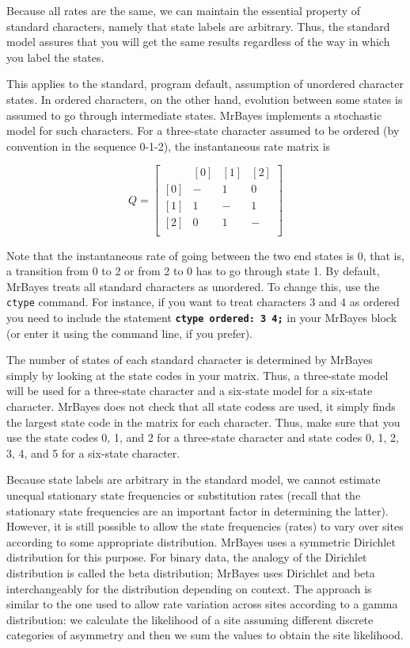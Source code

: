 \documentclass[12pt]{book}
\newcommand{\ttt}[1]{\texttt{#1}}
\newcommand{\tb}[1]{\ttt{\textbf{#1}}}
\begin{document}
Because all rates are the same, we can maintain the essential property of standard characters,
namely that state labels are arbitrary. Thus, the standard model assures that you will get the same
results regardless of the way in which you label the states.

This applies to the standard, program default, assumption of unordered character states. In ordered
characters, on the other hand, evolution between some states is assumed to go through intermediate
states. MrBayes implements a stochastic model for such characters. For a three-state character
assumed to be ordered (by convention in the sequence 0-1-2), the instantaneous rate matrix is

\[
Q=\begin{bmatrix}
    & [0] & [1] & [2]\\
 [0]& - & 1 & 0\\
 [1]& 1& -  & 1\\
 [2]& 0& 1  & -\\
\end{bmatrix}
\]

Note that the instantaneous rate of going between the two end states is 0, that is, a transition
from 0 to 2 or from 2 to 0 has to go through state 1. By default, MrBayes treats all standard
characters as unordered. To change this, use the \ttt{ctype} command. For instance, if you want to
treat characters 3 and 4 as ordered you need to include the statement \tb{ctype ordered: 3 4;} in
your MrBayes block (or enter it using the command line, if you prefer).

The number of states of each standard character is determined by MrBayes simply by looking at the
state codes in your matrix. Thus, a three-state model will be used for a three-state character and
a six-state model for a six-state character. MrBayes does not check that all state codess are used,
it simply finds the largest state code in the matrix for each character. Thus, make sure that you
use the state codes 0, 1, and 2 for a three-state character and state codes 0, 1, 2, 3, 4, and 5
for a six-state character.

Because state labels are arbitrary in the standard model, we cannot estimate unequal stationary
state frequencies or substitution rates (recall that the stationary state frequencies are an
important factor in determining the latter). However, it is still possible to allow the state
frequencies (rates) to vary over sites according to some appropriate distribution. MrBayes uses a
symmetric Dirichlet distribution for this purpose. For binary data, the analogy of the Dirichlet
distribution is called the beta distribution; MrBayes uses Dirichlet and beta interchangeably for
the distribution depending on context. The approach is similar to the one used to allow rate
variation across sites according to a gamma distribution: we calculate the likelihood of a site
assuming different discrete categories of asymmetry and then we sum the values to obtain the site
likelihood.
\end{document}
